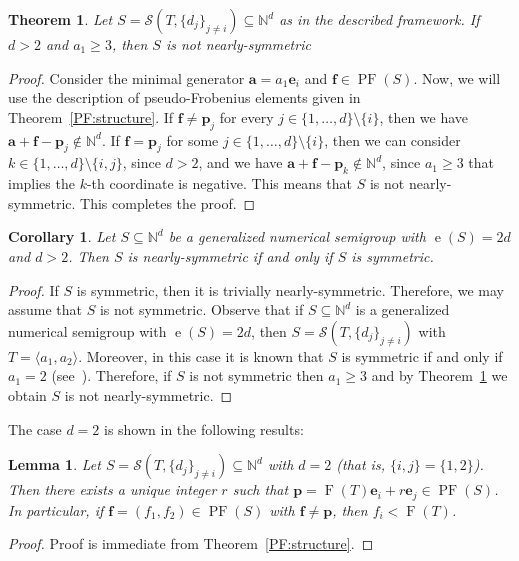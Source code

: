\documentclass[12pt]{amsart}
\theoremstyle{plain}
\theoremstyle{theorem}
\newtheorem{theorem}[definition]{Theorem}
\newtheorem{lemma}[definition]{Lemma}
\newtheorem{corollary}[definition]{Corollary}
\theoremstyle{remark}
\begin{document}
\begin{theorem}\label{thm:semigroup1}
	Let $S=\mathcal{S}(T,\{d_j\}_{j\neq i})\subseteq \mathbb{N}^d$ as in the described framework. If $d>2$ and $a_1\geq 3$, then $S$ is not nearly-symmetric
\end{theorem} 
\begin{proof} 
	Consider the minimal generator $\mathbf{a}=a_1\mathbf{e}_i$ and $\mathbf{f}\in \operatorname{PF}(S)$. Now, we will use the description of pseudo-Frobenius elements given in  Theorem~\ref{PF:structure}. If $\mathbf{f}\neq \mathbf{p}_j$ for every $j\in \{1,\ldots,d\}\setminus \{i\}$, then we have $\mathbf{a}+\mathbf{f}-\mathbf{p}_j\notin \mathbb{N}^d$. If $\mathbf{f}= \mathbf{p}_j$ for some $j\in \{1,\ldots,d\}\setminus \{i\}$, then we can consider $k\in \{1,\ldots,d\}\setminus \{i,j\}$, since $d>2$, and we have $\mathbf{a}+\mathbf{f}-\mathbf{p}_k\notin \mathbb{N}^d$, since $a_1\geq 3$ that implies the $k$-th coordinate is negative. This means that $S$ is not nearly-symmetric. This completes the proof.
\end{proof}





\begin{corollary}
	Let $S\subseteq \mathbb{N}^d$ be a generalized numerical semigroup with $\operatorname{e}(S)=2d$ and $d>2$. Then $S$ is nearly-symmetric if and only if $S$ is symmetric.
\end{corollary}
\begin{proof}
	If $S$ is symmetric, then it is trivially nearly-symmetric. Therefore, we may assume that $S$ is not symmetric. Observe that if $S\subseteq \mathbb{N}^d$ is a generalized numerical semigroup with $\operatorname{e}(S)=2d$, then $S=\mathcal{S}(T,\{d_j\}_{j\neq i})$ with $T=\langle a_1 , a_2 \rangle$. 
	Moreover, in this case it is known that $S$ is symmetric if and only if $a_1=2$ (see~\cite[Proposition 1.4]{Bhardwaj-Cisto2025}). Therefore, if $S$ is not symmetric then $a_1\geq 3$ and by Theorem~\ref{thm:semigroup1} we obtain $S$ is not nearly-symmetric.
\end{proof}

The case $d=2$ is shown in the following results:

\begin{lemma}\label{lemma2}
	Let $S=\mathcal{S}(T,\{d_j\}_{j\neq i})\subseteq \mathbb{N}^d$ with $d=2$ (that is, $\{i,j\}=\{1,2\}$). Then there exists a unique integer $r$ such that $\mathbf{p}=\operatorname{F}(T)\mathbf{e}_i+r\mathbf{e}_j\in \operatorname{PF}(S)$.
	In particular, if $\mathbf{f}=(f_1,f_2)\in \operatorname{PF}(S)$ with $\mathbf{f}\neq \mathbf{p}$, then $f_i<\operatorname{F}(T)$.
\end{lemma}
\begin{proof}
	Proof is immediate from Theorem~\ref{PF:structure}.
\end{proof}
\end{document}
